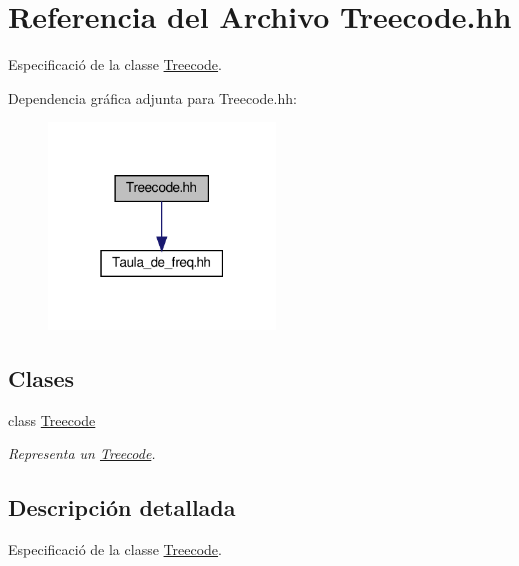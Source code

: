 \hypertarget{_treecode_8hh}{}\section{Referencia del Archivo Treecode.\+hh}
\label{_treecode_8hh}


Especificació de la classe \hyperlink{class_treecode}{Treecode}.  


Dependencia gráfica adjunta para Treecode.\+hh\+:\nopagebreak
\begin{figure}[H]
\begin{center}
\leavevmode
\includegraphics[width=171pt]{_treecode_8hh__incl}
\end{center}
\end{figure}
\subsection*{Clases}
\begin{DoxyCompactItemize}
\item 
class \hyperlink{class_treecode}{Treecode}
\begin{DoxyCompactList}\small\item\em Representa un \hyperlink{class_treecode}{Treecode}. \end{DoxyCompactList}\end{DoxyCompactItemize}


\subsection{Descripción detallada}
Especificació de la classe \hyperlink{class_treecode}{Treecode}. 

